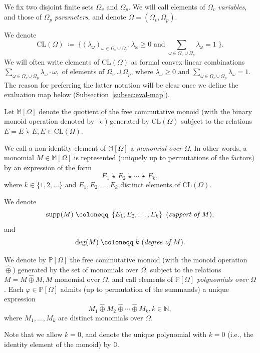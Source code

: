\documentclass[10pt]{amsart}
\theoremstyle{plain}
\theoremstyle{definition}
\let\geq\geqslant
\providecommand{\defeq}[0]{\ensuremath{\;\coloneqq\;}\xspace}
\providecommand{\cplus}[0]{\ensuremath{\hat{\oplus}}\xspace}
\providecommand{\cmult}[0]{\ensuremath{{\,\mathring{\star}\,}}\xspace}
\providecommand{\CL}[0]{\ensuremath{\mathrm{CL}}\xspace}
\providecommand{\elem}[0]{\ensuremath{\mathrm{supp}}\xspace}
\begin{document}
We fix two disjoint finite sets $\Omega_v$ and $\Omega_p$. We will call elements of $\Omega_v$ \emph{variables}, and those of $\Omega_p$ \emph{parameters}, and denote 
$\Omega =(\Omega_v,\Omega_p)$.


We denote 
\begin{equation}\label{eqn:cl-omega}
    \CL(\Omega) \defeq \{ \left(
             \lambda_\omega\right)_{\omega\in\Omega_v \cup \Omega_p}, \lambda_\omega\geq0 \text{ and }
            \sum_{\omega\in\Omega_v \cup \Omega_p}\lambda_\omega=1 
        \; \}.
\end{equation}
We will often write elements of $\CL(\Omega)$ as formal 
convex linear combinations
$
\sum_{\omega\in \Omega_v \cup \Omega_p} \lambda_\omega\cdot \omega,
$
of elements of $\Omega_v \cup \Omega_p$,
where 
$
\lambda_\omega\geq0\text{ and }
            \sum_{\omega\in\Omega_v \cup \Omega_p}\lambda_\omega=1 
$.
The reason for preferring the latter notation will be clear once we define the evaluation map below (Subsection~\ref{subsec:eval-map}).

Let $\mathbb{M}[\Omega]$ denote the quotient of the free commutative monoid 
(with the binary monoid operation denoted by $\cmult$) generated by $\CL(\Omega)$ subject to the relations $E = E \cmult E, E \in \CL(\Omega)$.

We call a non-identity element of 
$\mathbb{M}[\Omega]$ a \emph{monomial over $\Omega$}.
In other words, a monomial $M \in \mathbb{M}[\Omega]$ is represented (uniquely up to permutations of the factors) by an expression of the form
\[
E_1\cmult E_2\cmult \dotsi \cmult E_k,
\]
where $k\in\{1,2,\dotsc\}$ and $E_1,E_2,\dotsc, E_k$ distinct elements of $\CL(\Omega)$.

We denote 
\[
\elem(M)\defeq \left\{E_1, E_2, \dotsc, E_k\right\} \text{ (\emph{support of $M$}),}
\]
and 
\[
\deg(M)\defeq k \text{ (\emph{degree of $M$}).} 
\]

We denote by $\mathbb{P}[\Omega]$ the free commutative monoid (with the monoid operation $\cplus$) generated by the set of monomials over $\Omega$,
subject to the relations $M=M\cplus M, M \text{ monomial over $\Omega$}$, and call
elements of $\mathbb{P}[\Omega]$
\emph{polynomials over $\Omega$}.
Each $\varphi \in \mathbb P[\Omega]$ admits (up to permutation of the summands)
a unique expression
\[
M_1 \cplus M_2 \cplus \dotsi \cplus M_k, k \in \mathbb{N},
\]
where $M_1,\ldots, M_k$ are distinct monomials over $\Omega$.
 
Note that we allow $k=0$, and denote the unique polynomial
with $k=0$ (i.e., the identity element of the monoid) by $\mathbb{0}$. 
\end{document}
